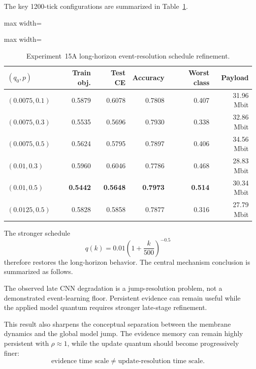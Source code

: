 The key 1200-tick configurations are summarized in Table~\ref{tab:exp15a-resolution-sweep}.
\begin{table}[ht]
\centering
\small
\caption{Experiment~15A long-horizon event-resolution schedule refinement.}
\label{tab:exp15a-resolution-sweep}
\begin{adjustbox}{max width=\textwidth}
\begin{adjustbox}{max width=\textwidth}
\begin{tabular}{lrrrrr}
\toprule
$(q_0,p)$ & Train obj. & Test CE & Accuracy & Worst class & Payload\\
\midrule
$(0.0075,0.1)$ & 0.5879 & 0.6078 & 0.7808 & 0.407 & 31.96 Mbit\\
$(0.0075,0.3)$ & 0.5535 & 0.5696 & 0.7930 & 0.338 & 32.86 Mbit\\
$(0.0075,0.5)$ & 0.5624 & 0.5795 & 0.7897 & 0.406 & 34.56 Mbit\\
$(0.01,0.3)$ & 0.5960 & 0.6046 & 0.7786 & 0.468 & 28.83 Mbit\\
$\mathbf{(0.01,0.5)}$ & \textbf{0.5442} & \textbf{0.5648} & \textbf{0.7973} & \textbf{0.514} & 30.34 Mbit\\
$(0.0125,0.5)$ & 0.5828 & 0.5858 & 0.7877 & 0.316 & 27.79 Mbit\\
\bottomrule
\end{tabular}
\end{adjustbox}
\end{adjustbox}
\end{table}
The stronger schedule
\begin{equation}
\boxed{
q(k)=0.01\left(1+\frac{k}{500}\right)^{-0.5}
}
\end{equation}
therefore restores the long-horizon behavior. The central mechanism conclusion is summarized as follows.
\begin{takeawaybox}[title={Resolution-annealing conclusion}]
The observed late CNN degradation is a jump-resolution problem, not a demonstrated event-learning floor. Persistent evidence can remain useful while the applied model quantum requires stronger late-stage refinement.
\end{takeawaybox}

This result also sharpens the conceptual separation between the membrane dynamics and the global model jump. The evidence memory can remain highly persistent with $\rho\approx1$, while the update quantum should become progressively finer:
\begin{equation}
\boxed{\text{evidence time scale}\neq\text{update-resolution time scale}.}
\end{equation}

